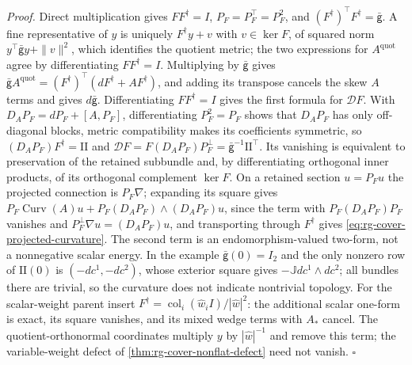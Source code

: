 \noindent\emph{Proof.}
Direct multiplication gives \(FF^\dagger=I\), \(P_F=P_F^\top=P_F^2\), and
\((F^\dagger)^\top F^\dagger=\bar{\mathsf g}\). A fine representative of \(y\) is
uniquely \(F^\dagger y+v\) with \(v\in\ker F\), of squared norm
\(y^\top\bar{\mathsf g}y+\|v\|^2\), which identifies the quotient metric; the two
expressions for \(A^{\mathrm{quot}}\) agree by differentiating \(FF^\dagger=I\).
Multiplying by \(\bar{\mathsf g}\) gives
\(\bar{\mathsf g}A^{\mathrm{quot}}=(F^\dagger)^\top(dF^\dagger+AF^\dagger)\), and
adding its transpose cancels the skew \(A\) terms and gives \(d\bar{\mathsf g}\).
Differentiating \(FF^\dagger=I\) gives the first formula for \(\mathcal DF\). With
\(D_AP_F=dP_F+[A,P_F]\), differentiating \(P_F^2=P_F\) shows that \(D_AP_F\) has
only off-diagonal blocks, metric compatibility makes its coefficients symmetric,
so \((D_AP_F)F^\dagger=\mathrm{II}\) and
\(\mathcal DF=F(D_AP_F)P_F^\perp=\bar{\mathsf g}^{-1}\mathrm{II}^\top\). Its
vanishing is equivalent to preservation of the retained subbundle and, by
differentiating orthogonal inner products, of its orthogonal complement
\(\ker F\). On a retained section \(u=P_Fu\) the projected connection is
\(P_F\nabla\); expanding its square gives
\(P_F\operatorname{Curv}(A)u+P_F(D_AP_F)\wedge(D_AP_F)u\), since the term with
\(P_F(D_AP_F)P_F\) vanishes and \(P_F^\perp\nabla u=(D_AP_F)u\), and transporting
through \(F^\dagger\) gives \eqref{eq:rg-cover-projected-curvature}. The second
term is an endomorphism-valued two-form, not a nonnegative scalar energy. In the
example \(\bar{\mathsf g}(0)=I_2\) and the only nonzero row of \(\mathrm{II}(0)\) is
\((-dc^1,-dc^2)\), whose exterior square gives
\(-\mathbb Jdc^1\wedge dc^2\); all bundles there are trivial, so the curvature
does not indicate nontrivial topology. For the scalar-weight parent insert
\(F^\dagger=\operatorname{col}_i(\widehat w_iI)/|\widehat w|^2\): the additional
scalar one-form is exact, its square vanishes, and its mixed wedge terms with
\(A_*\) cancel. The quotient-orthonormal coordinates multiply \(y\) by
\(|\widehat w|^{-1}\) and remove this term; the variable-weight defect of
\cref{thm:rg-cover-nonflat-defect} need not vanish. \(\square\)

